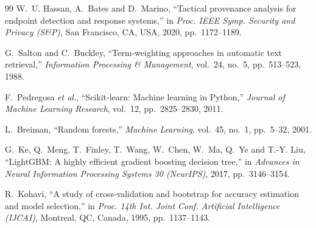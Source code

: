 \documentclass[12pt,a4paper]{article}
\begin{document}
\begin{thebibliography}{99}
 W.~U. Hassan, A.~Bates and D.~Marino, ``Tactical provenance analysis for endpoint detection and response systems,'' in \emph{Proc. IEEE Symp. Security and Privacy (S\&P)}, San Francisco, CA, USA, 2020, pp.~1172--1189.

 G.~Salton and C.~Buckley, ``Term-weighting approaches in automatic text retrieval,'' \emph{Information Processing \& Management}, vol.~24, no.~5, pp.~513--523, 1988.

 F.~Pedregosa \emph{et al.}, ``Scikit-learn: Machine learning in Python,'' \emph{Journal of Machine Learning Research}, vol.~12, pp.~2825--2830, 2011.

 L.~Breiman, ``Random forests,'' \emph{Machine Learning}, vol.~45, no.~1, pp.~5--32, 2001.

 G.~Ke, Q.~Meng, T.~Finley, T.~Wang, W.~Chen, W.~Ma, Q.~Ye and T.-Y. Liu, ``LightGBM: A highly efficient gradient boosting decision tree,'' in \emph{Advances in Neural Information Processing Systems 30 (NeurIPS)}, 2017, pp.~3146--3154.

 R.~Kohavi, ``A study of cross-validation and bootstrap for accuracy estimation and model selection,'' in \emph{Proc. 14th Int. Joint Conf. Artificial Intelligence (IJCAI)}, Montreal, QC, Canada, 1995, pp.~1137--1143.

\end{thebibliography}
\end{document}
